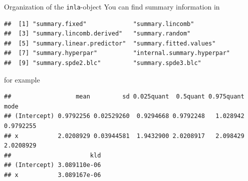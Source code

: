 \documentclass[
  ignorenonframetext,
]{beamer}
\newenvironment{Shaded}{\begin{snugshade}}{\end{snugshade}}
\newcommand{\NormalTok}[1]{#1}
\newcommand{\SpecialCharTok}[1]{\textcolor[rgb]{0.00,0.00,0.00}{#1}}
\begin{document}
\begin{frame}[fragile]{Organization of the \texttt{inla}-object}
\protect\hypertarget{organization-of-the-inla-object-1}{}
You can find summary information in \small

\begin{verbatim}
##  [1] "summary.fixed"             "summary.lincomb"          
##  [3] "summary.lincomb.derived"   "summary.random"           
##  [5] "summary.linear.predictor"  "summary.fitted.values"    
##  [7] "summary.hyperpar"          "internal.summary.hyperpar"
##  [9] "summary.spde2.blc"         "summary.spde3.blc"
\end{verbatim}

\normalsize

for example

\scriptsize

\begin{Shaded}
\end{Shaded}

\begin{verbatim}
##                  mean         sd 0.025quant  0.5quant 0.975quant      mode
## (Intercept) 0.9792256 0.02529260  0.9294668 0.9792248   1.028942 0.9792255
## x           2.0208929 0.03944581  1.9432900 2.0208917   2.098429 2.0208929
##                      kld
## (Intercept) 3.089110e-06
## x           3.089167e-06
\end{verbatim}

\normalsize
\end{frame}
\end{document}

